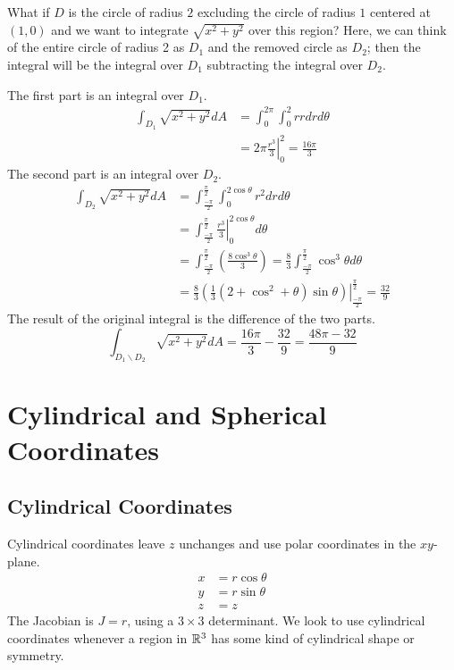 \documentclass[fleqn,letterpaper]{report}
\begin{document}
\begin{example}
What if $D$ is the circle of radius $2$ excluding the circle
of radius $1$ centered at $(1,0)$ and we want to integrate
$\sqrt{x^2 + y^2}$ over this region? Here, we can think of
the entire circle of radius 2 as $D_1$ and the removed circle
as $D_2$; then the integral will be the integral over $D_1$
subtracting the integral over $D_2$. 

The first part is an integral over $D_1$.
\begin{align*}
\int_{D_1} \sqrt{x^2 + y^2} dA & = \int_0^{2\pi} \int_0^2 r r
dr d\theta \\
& = \left. 2\pi \frac{r^3}{3} \right|_0^2 = \frac{16\pi}{3}
\end{align*}
The second part is an integral over $D_2$.
\begin{align*}
\int_{D_2} \sqrt{x^2 + y^2} dA & =
\int_{\frac{-\pi}{2}}^{\frac{\pi}{2}} \int_0^{2 \cos \theta}
r^2 dr d\theta \\
& = \int_{\frac{-\pi}{2}}^{\frac{\pi}{2}} \left. \frac{r^3}{3}
\right|_0^{2 \cos \theta} d\theta \\
& = \int_{\frac{-\pi}{2}}^{\frac{\pi}{2}} \left( 
\frac{8 \cos^3 \theta}{3} \right) = 
\frac{8}{3} \int_{\frac{-\pi}{2}}^{\frac{\pi}{2}} \cos^3
\theta d \theta \\
& = \frac{8}{3} \left. \left( \frac{1}{3} (2 + \cos^2
+ \theta) \sin \theta \right)
\right|_{\frac{-\pi}{2}}^{\frac{\pi}{2}} = \frac{32}{9} 
\end{align*}
The result of the original integral is the difference of the
two parts.
\begin{equation*}
\int_{D_1 \backslash D_2} \sqrt{x^2 + y^2} dA = \frac{16\pi}{3} -
\frac{32}{9} = \frac{48\pi - 32}{9}
\end{equation*}
\end{example}

\section{Cylindrical and Spherical Coordinates}
\label{cylindrical-and-spherical}

\subsection{Cylindrical Coordinates}
\label{cylindrical}

Cylindrical coordinates leave $z$ unchanges and use polar
coordinates in the $xy$-plane.
\begin{align*}
x & = r \cos \theta \\
y & = r \sin \theta \\
z & = z
\end{align*}
The Jacobian is $J = r$, using a $3 \times 3$ determinant. We
look to use cylindrical coordinates whenever a region in
$\mathbb{R}^3$ has some kind of cylindrical shape or symmetry.
\end{document}
